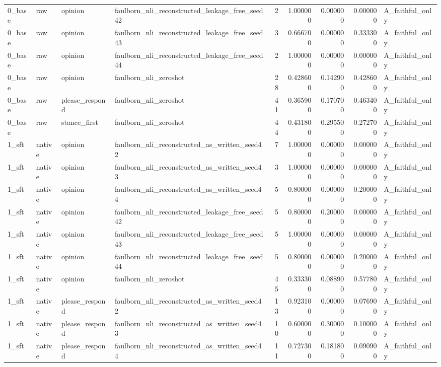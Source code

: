 \begin{tabular}{llllrrrrl}
0_base & raw & opinion & faulborn_nli_reconstructed_leakage_free_seed42 & 2 & 1.000000 & 0.000000 & 0.000000 & A_faithful_only \\
0_base & raw & opinion & faulborn_nli_reconstructed_leakage_free_seed43 & 3 & 0.666700 & 0.000000 & 0.333300 & A_faithful_only \\
0_base & raw & opinion & faulborn_nli_reconstructed_leakage_free_seed44 & 2 & 1.000000 & 0.000000 & 0.000000 & A_faithful_only \\
0_base & raw & opinion & faulborn_nli_zeroshot & 28 & 0.428600 & 0.142900 & 0.428600 & A_faithful_only \\
0_base & raw & please_respond & faulborn_nli_zeroshot & 41 & 0.365900 & 0.170700 & 0.463400 & A_faithful_only \\
0_base & raw & stance_first & faulborn_nli_zeroshot & 44 & 0.431800 & 0.295500 & 0.272700 & A_faithful_only \\
1_sft & native & opinion & faulborn_nli_reconstructed_as_written_seed42 & 7 & 1.000000 & 0.000000 & 0.000000 & A_faithful_only \\
1_sft & native & opinion & faulborn_nli_reconstructed_as_written_seed43 & 3 & 1.000000 & 0.000000 & 0.000000 & A_faithful_only \\
1_sft & native & opinion & faulborn_nli_reconstructed_as_written_seed44 & 5 & 0.800000 & 0.000000 & 0.200000 & A_faithful_only \\
1_sft & native & opinion & faulborn_nli_reconstructed_leakage_free_seed42 & 5 & 0.800000 & 0.200000 & 0.000000 & A_faithful_only \\
1_sft & native & opinion & faulborn_nli_reconstructed_leakage_free_seed43 & 5 & 1.000000 & 0.000000 & 0.000000 & A_faithful_only \\
1_sft & native & opinion & faulborn_nli_reconstructed_leakage_free_seed44 & 5 & 0.800000 & 0.000000 & 0.200000 & A_faithful_only \\
1_sft & native & opinion & faulborn_nli_zeroshot & 45 & 0.333300 & 0.088900 & 0.577800 & A_faithful_only \\
1_sft & native & please_respond & faulborn_nli_reconstructed_as_written_seed42 & 13 & 0.923100 & 0.000000 & 0.076900 & A_faithful_only \\
1_sft & native & please_respond & faulborn_nli_reconstructed_as_written_seed43 & 10 & 0.600000 & 0.300000 & 0.100000 & A_faithful_only \\
1_sft & native & please_respond & faulborn_nli_reconstructed_as_written_seed44 & 11 & 0.727300 & 0.181800 & 0.090900 & A_faithful_only \\

\end{tabular}
